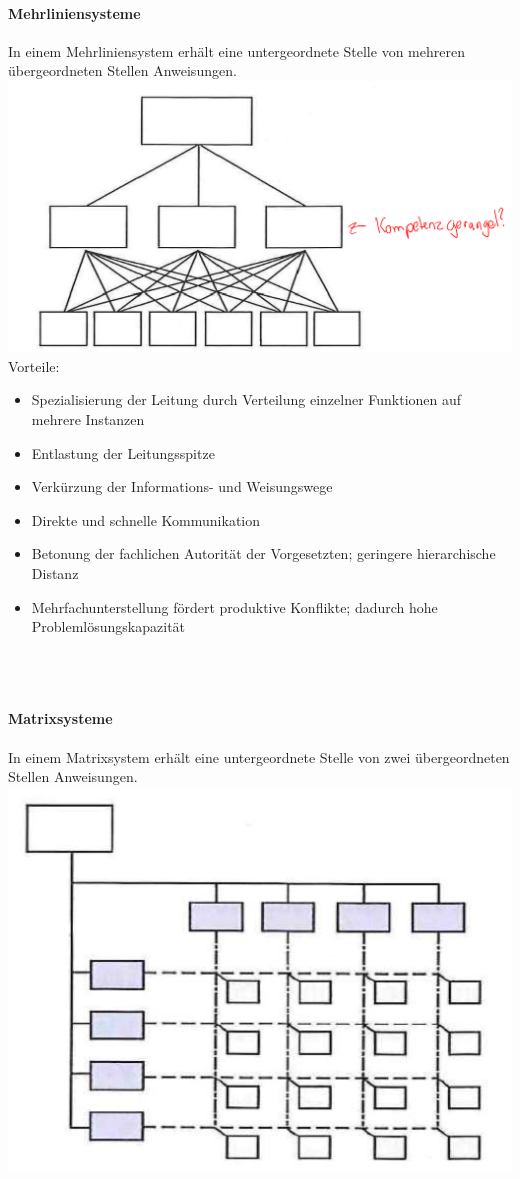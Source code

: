 \begin{multicols}{2}
	\paragraph{Mehrliniensysteme}
	In einem Mehrliniensystem erhält eine untergeordnete Stelle von	mehreren übergeordneten Stellen Anweisungen.
	\includegraphics[width=1\linewidth]{images/mehrliniensystem}
	Vorteile:
	\begin{itemize}
		\item Spezialisierung der Leitung durch Verteilung einzelner Funktionen auf mehrere Instanzen
		\item Entlastung der Leitungsspitze
		\item Verkürzung der Informations- und Weisungswege
		\item Direkte und schnelle Kommunikation
		\item Betonung der fachlichen Autorität der Vorgesetzten; geringere hierarchische Distanz
		\item Mehrfachunterstellung fördert produktive Konflikte; dadurch hohe Problemlösungskapazität
	\end{itemize}
	\ \\ \ \\
\end{multicols}

\paragraph{Matrixsysteme}
In einem Matrixsystem erhält eine untergeordnete Stelle von zwei übergeordneten Stellen Anweisungen. \\
\includegraphics[width=0.35\linewidth]{images/matrixsystem}

